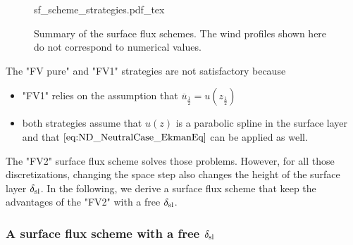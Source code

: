 \begin{figure}
	{sf_scheme_strategies.pdf_tex}
	\caption{Summary of the surface flux schemes. The
	wind profiles shown here do not correspond to
	numerical values.}
	\label{fig:ND_NeutralCase_summary_sfscheme}
\end{figure}

The "FV pure" and "FV1" strategies are not satisfactory because
\begin{itemize}
	\item "FV1" relies on the assumption that $\overline{u}_{\frac{1}{2}} = u(z_{\frac{1}{2}})$
	\item both strategies assume that $u(z)$ is a parabolic spline in the surface layer and that $\eqref{eq:ND_NeutralCase_EkmanEq}$
		can be applied as well.
\end{itemize}
The "FV2" surface flux scheme solves those problems.
However, for all those discretizations, changing the space step
also changes the height of the surface layer $\delta_{\rm sl}$.
In the following, we derive a surface flux scheme that keep
the advantages of the "FV2" with a free $\delta_{\rm sl}$.

\subsubsection{A surface flux scheme with a free $\delta_{\rm sl}$}



